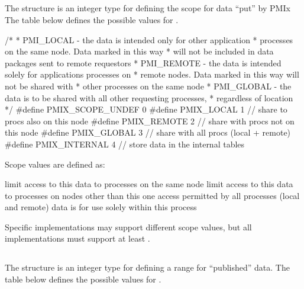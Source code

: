 \subsection{}

The  structure is an integer type for defining the scope for data ``put'' by PMIx
The table below defines the possible values for .

\cspecificstart
\begin{codepar}
/*
 * PMI_LOCAL - the data is intended only for other application
 *             processes on the same node. Data marked in this way
 *             will not be included in data packages sent to remote requestors
 * PMI_REMOTE - the data is intended solely for applications processes on
 *              remote nodes. Data marked in this way will not be shared with
 *              other processes on the same node
 * PMI_GLOBAL - the data is to be shared with all other requesting processes,
 *              regardless of location
 */
#define PMIX_SCOPE_UNDEF    0
#define PMIX_LOCAL          1   // share to procs also on this node
#define PMIX_REMOTE         2   // share with procs not on this node
#define PMIX_GLOBAL         3   // share with all procs (local + remote)
#define PMIX_INTERNAL       4   // store data in the internal tables
\end{codepar}
\cspecificend

Scope values are defined as:
\begin{constantdesc}
 limit access to this data to processes on the same node
 limit access to this data to processes on nodes other than this one
 access permitted by all processes (local and remote)
 data is for use solely within this process
\end{constantdesc}

Specific implementations may support different scope values, but all implementations must support at least .



\subsection{}

The  structure is an integer type for defining a range for ``published'' data.
The table below defines the possible values for .

